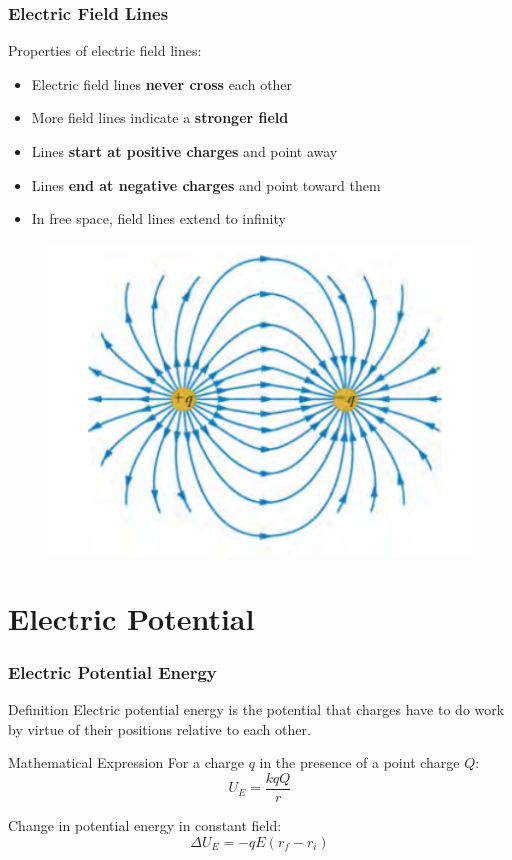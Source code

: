 \documentclass{beamer}
\begin{document}
\begin{frame}
    \frametitle{Electric Field Lines}
    Properties of electric field lines:
    \begin{itemize}
        \item Electric field lines \textbf{never cross} each other
        \item More field lines indicate a \textbf{stronger field}
        \item Lines \textbf{start at positive charges} and point away
        \item Lines \textbf{end at negative charges} and point toward them
        \item In free space, field lines extend to infinity
    \end{itemize}
    
    
        \begin{figure}
            \centering
            \includegraphics[width=0.5\linewidth]{psng.png}
        \end{figure}
    
\end{frame}

\section{Electric Potential}

\begin{frame}
    \frametitle{Electric Potential Energy}
    \begin{block}{Definition}
        Electric potential energy is the potential that charges have to do work by virtue of their positions relative to each other.
    \end{block}
    
    \begin{block}{Mathematical Expression}
        For a charge $q$ in the presence of a point charge $Q$:
        \begin{equation}
            U_E = \frac{kqQ}{r}
        \end{equation}
        
        Change in potential energy in constant field:
        \begin{equation}
            \Delta U_E = -qE(r_f - r_i)
        \end{equation}
    \end{block}
\end{frame}
\end{document}
